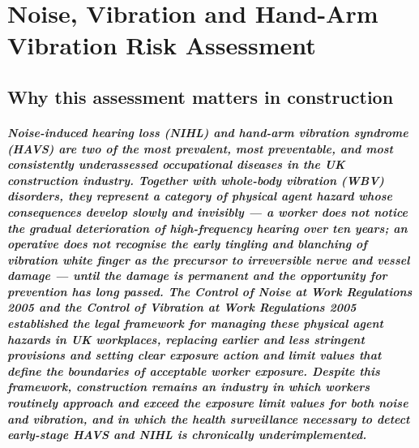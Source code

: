 \chapter{Noise, Vibration and Hand-Arm Vibration Risk Assessment}
\label{chap:Noise, Vibration and Hand-Arm Vibration Risk Assessment}

\section{Why this assessment matters in construction}

\paragraph{Noise-induced hearing loss (NIHL) and hand-arm vibration syndrome (HAVS) are two of the most prevalent, most preventable, and most consistently underassessed occupational diseases in the UK construction industry. Together with whole-body vibration (WBV) disorders, they represent a category of physical agent hazard whose consequences develop slowly and invisibly --- a worker does not notice the gradual deterioration of high-frequency hearing over ten years; an operative does not recognise the early tingling and blanching of vibration white finger as the precursor to irreversible nerve and vessel damage --- until the damage is permanent and the opportunity for prevention has long passed. The Control of Noise at Work Regulations 2005 and the Control of Vibration at Work Regulations 2005 established the legal framework for managing these physical agent hazards in UK workplaces, replacing earlier and less stringent provisions and setting clear exposure action and limit values that define the boundaries of acceptable worker exposure. Despite this framework, construction remains an industry in which workers routinely approach and exceed the exposure limit values for both noise and vibration, and in which the health surveillance necessary to detect early-stage HAVS and NIHL is chronically underimplemented.}

